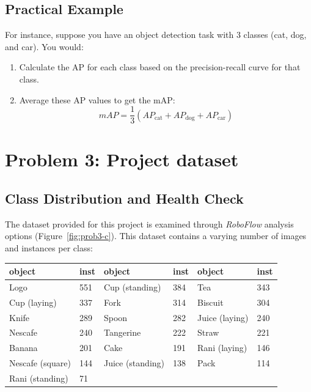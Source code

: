 \documentclass[conference]{IEEEtran}
\begin{document}
\subsection*{Practical Example}
For instance, suppose you have an object detection task with 3 classes (cat, dog, and car). You would:
\begin{enumerate}
  \item Calculate the AP for each class based on the precision-recall curve for that class.
  \item Average these AP values to get the mAP:
        \[
          mAP = \frac{1}{3} \left(AP_{\text{cat}} + AP_{\text{dog}} + AP_{\text{car}}\right)
        \]
\end{enumerate}

\section{Problem 3: Project dataset}
\subsection{Class Distribution and Health Check}
The dataset provided for this project is examined through \textit{RoboFlow} analysis options (Figure~\ref{fig:prob3-c}). This dataset contains a varying number of images and instances per class:
\begin{table}[H]
  \def\arraystretch{1.25}
  \begin{center}
    \begin{tabular}{|ll|ll|ll|}
      \hline
      object           & inst & object           & inst & object         & inst \\
      \hline
      Logo             & 551  & Cup (standing)   & 384  & Tea            & 343  \\
      Cup (laying)     & 337  & Fork             & 314  & Biscuit        & 304  \\
      Knife            & 289  & Spoon            & 282  & Juice (laying) & 240  \\
      Nescafe          & 240  & Tangerine        & 222  & Straw          & 221  \\
      Banana           & 201  & Cake             & 191  & Rani (laying)  & 146  \\
      Nescafe (square) & 144  & Juice (standing) & 138  & Pack           & 114  \\
      Rani (standing)  & 71   &                  &      &                &      \\
      \hline
    \end{tabular}
  \end{center}
\end{table}
\end{document}
